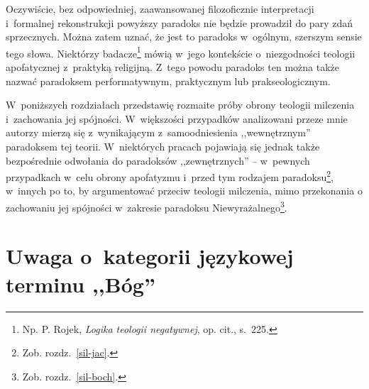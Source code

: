 Oczywiście, bez odpowiedniej, zaawansowanej filozoficznie interpretacji i~formalnej rekonstrukcji powyższy paradoks nie będzie prowadził do pary zdań sprzecznych. Można zatem uznać, że jest to paradoks w~ogólnym, szerszym sensie tego słowa. Niektórzy badacze\footnote{Np. P. Rojek, \textit{Logika teologii negatywnej}, op. cit., s.~225.} mówią w~jego kontekście o~niezgodności teologii apofatycznej z~praktyką religijną. Z~tego powodu paradoks ten można także nazwać paradoksem performatywnym, praktycznym lub prakseologicznym.

W~poniższych rozdziałach przedstawię rozmaite próby obrony teologii milczenia i~zachowania jej spójności. W~większości przypadków analizowani przeze mnie autorzy mierzą się z~wynikającym z~samoodniesienia ,,wewnętrznym'' paradoksem tej teorii. W~niektórych pracach pojawiają się jednak także bezpośrednie odwołania  do paradoksów ,,zewnętrznych'' -- w~pewnych przypadkach w~celu obrony apofatyzmu i~przed tym rodzajem paradoksu\footnote{Zob. rozdz.~\ref{sil-jac}.}, w~innych po to, by argumentować przeciw teologii milczenia, mimo przekonania o zachowaniu jej spójności w~zakresie paradoksu Niewyrażalnego\footnote{Zob. rozdz.~\ref{sil-boch}.}.


\section{Uwaga o~kategorii językowej terminu ,,Bóg''}\label{sil-kt-jez}

